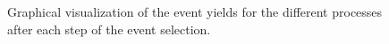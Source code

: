 \begin{figure}[H!]
\begin{center}
\caption{\label{fig:cutflow}Graphical visualization of the event yields for the different processes after each step of the event selection.}
\end{center}
\end{figure}              
                             
\clearpage

